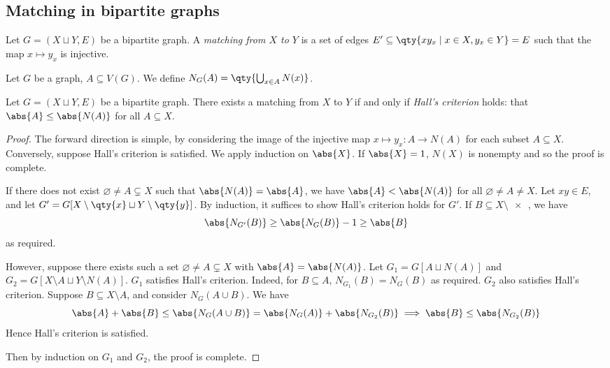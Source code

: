 \subsection{Matching in bipartite graphs}
\begin{definition}
	Let \( G = (X \sqcup Y, E) \) be a bipartite graph.
	A \emph{matching from \( X \) to \( Y \)} is a set of edges \( E' \subseteq \qty{xy_x \mid x \in X, y_x \in Y} = E \) such that the map \( x \mapsto y_x \) is injective.
\end{definition}
\begin{definition}
	Let \( G \) be a graph, \( A \subseteq V(G) \).
	We define \( N_G(A) = \qty{\bigcup_{x \in A} N(x)} \).
\end{definition}
\begin{theorem}[Hall]
	Let \( G = (X \sqcup Y, E) \) be a bipartite graph.
	There exists a matching from \( X \) to \( Y \) if and only if \emph{Hall's criterion} holds: that \( \abs{A} \leq \abs{N(A)} \) for all \( A \subseteq X \).
\end{theorem}
\begin{proof}
	The forward direction is simple, by considering the image of the injective map \( x \mapsto y_x : A \to N(A) \) for each subset \( A \subseteq X \).
	Conversely, suppose Hall's criterion is satisfied.
	We apply induction on \( \abs{X} \).
	If \( \abs{X} = 1 \), \( N(X) \) is nonempty and so the proof is complete.

	If there does not exist \( \varnothing \neq A \subsetneq X \) such that \( \abs{N(A)} = \abs{A} \), we have \( \abs{A} < \abs{N(A)} \) for all \( \varnothing \neq A \neq X \).
	Let \( xy \in E \), and let \( G' = G[X \setminus \qty{x} \sqcup Y \setminus \qty{y}] \).
	By induction, it suffices to show Hall's criterion holds for \( G' \).
	If \( B \subseteq X \setminus \qty{x} \), we have
	\[ \abs{N_{G'}(B)} \geq \abs{N_G(B)} - 1 \geq \abs{B} \]
	as required.

	However, suppose there exists such a set \( \varnothing \neq A \subsetneq X \) with \( \abs{A} = \abs{N(A)} \).
	Let \( G_1 = G[A \sqcup N(A)] \) and \( G_2 = G[X \setminus A \sqcup Y \setminus N(A)] \).
	\( G_1 \) satisfies Hall's criterion.
	Indeed, for \( B \subseteq A \), \( N_{G_1}(B) = N_G(B) \) as required.
	\( G_2 \) also satisfies Hall's criterion.
	Suppose \( B \subseteq X \setminus A \), and consider \( N_G(A \cup B) \).
	We have
	\[ \abs{A} + \abs{B} \leq \abs{N_G(A \cup B)} = \abs{N_G(A)} + \abs{N_{G_2}(B)} \implies \abs{B} \leq \abs{N_{G_2}(B)} \]
	Hence Hall's criterion is satisfied.

	Then by induction on \( G_1 \) and \( G_2 \), the proof is complete.
\end{proof}
